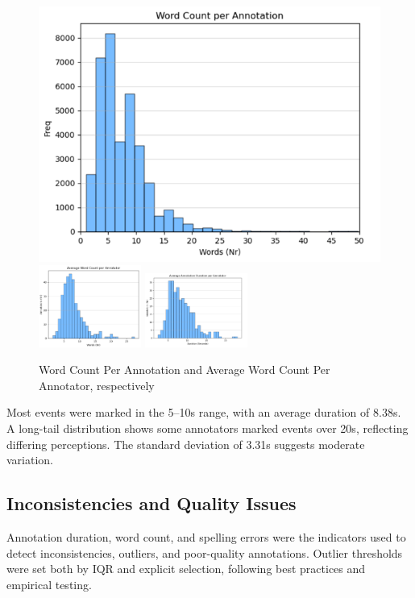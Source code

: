 \documentclass{article}
\begin{document}
\begin{figure}[h]
    \centering
    \includegraphics[width=0.3\linewidth]{figures/annotation_quality/word_count_per_annotation.png}
    \includegraphics[width=0.3\textwidth]{figures/annotation_quality/average_word_count_per_annotator.png}
    \includegraphics[width=0.3\textwidth]{figures/annotation_quality/average_annotation_duration_per_annotator.png}
    \caption{Word Count Per Annotation and Average Word Count Per Annotator, respectively} \label{fig:word_count_avg_word_count_avg_duration}
\end{figure}

Most events were marked in the 5–10s range, with an average duration of 8.38s. A long-tail distribution shows some annotators marked events over 20s, reflecting differing perceptions. The standard deviation of 3.31s suggests moderate variation.

\subsection{Inconsistencies and Quality Issues}

Annotation duration, word count, and spelling errors were the indicators used to detect inconsistencies, outliers, and poor-quality annotations. Outlier thresholds were set both by IQR and explicit selection, following best practices and empirical testing.
\end{document}
